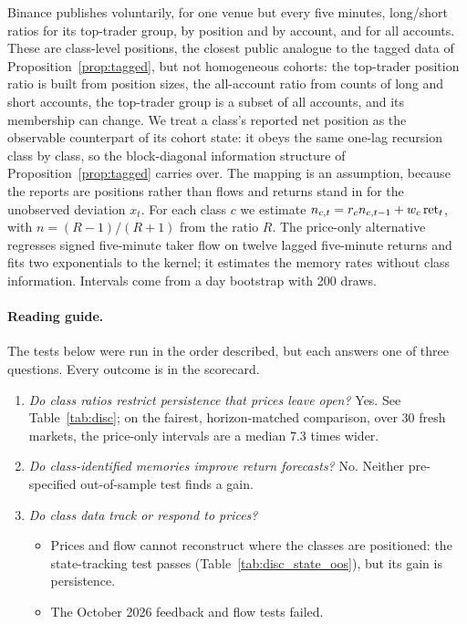 \documentclass[12pt]{article}
\theoremstyle{definition}
\theoremstyle{remark}
\begin{document}
Binance publishes voluntarily, for one venue but every five minutes, long/short ratios for its top-trader group, by position and by account, and for all accounts. These are class-level positions, the closest public analogue to the tagged data of Proposition~\ref{prop:tagged}, but not homogeneous cohorts: the top-trader position ratio is built from position sizes, the all-account ratio from counts of long and short accounts, the top-trader group is a subset of all accounts, and its membership can change. We treat a class's reported net position as the observable counterpart of its cohort state: it obeys the same one-lag recursion class by class, so the block-diagonal information structure of Proposition~\ref{prop:tagged} carries over. The mapping is an assumption, because the reports are positions rather than flows and returns stand in for the unobserved deviation $x_t$. For each class $c$ we estimate $n_{c,t}=r_cn_{c,t-1}+w_c\,{\rm ret}_t$, with $n=(R-1)/(R+1)$ from the ratio $R$. The price-only alternative regresses signed five-minute taker flow on twelve lagged five-minute returns and fits two exponentials to the kernel; it estimates the memory rates without class information. Intervals come from a day bootstrap with 200 draws.

\paragraph{Reading guide.} The tests below were run in the order described, but each answers one of three questions. Every outcome is in the scorecard.
\begin{enumerate}[label=(\arabic*),itemsep=1pt,topsep=2pt]
\item \emph{Do class ratios restrict persistence that prices leave open?} Yes. See Table~\ref{tab:disc}; on the fairest, horizon-matched comparison, over 30 fresh markets, the price-only intervals are a median 7.3 times wider.
\item \emph{Do class-identified memories improve return forecasts?} No. Neither pre-specified out-of-sample test finds a gain.
\item \emph{Do class data track or respond to prices?}
 \begin{itemize}[itemsep=1pt,topsep=2pt]
 \item Prices and flow cannot reconstruct where the classes are positioned: the state-tracking test passes (Table~\ref{tab:disc_state_oos}), but its gain is persistence.
 \item The October 2026 feedback and flow tests failed.
 \end{itemize}
\end{enumerate}
\end{document}
